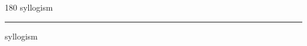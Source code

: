 
\begin{frame}
\begin{center}
\begin{turn}{180}
{\fontsize{2.5cm}{1em}\selectfont syllogism}
\end{turn}
\vspace{1em}\par  
\hrule
\vspace{1em}\par  
{\fontsize{2.5cm}{1em}\selectfont syllogism}
\end{center}
\end{frame}

